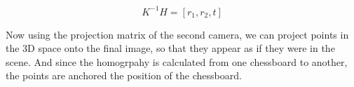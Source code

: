 \begin{equation}
	K^{-1}H = [r_{1}, r_{2}, t]
	\label{eq:solvingforrotation}
\end{equation}

Now using the projection matrix of the second camera, we can project points in the 3D space onto the final image, so that they appear as if they were in the scene. And since the homogrpahy is calculated from one chessboard to another, the points are anchored the position of the chessboard.

